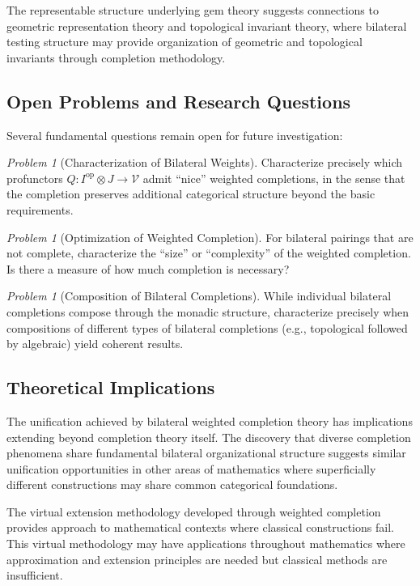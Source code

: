 \documentclass[11pt]{article}
\theoremstyle{plain}
\theoremstyle{definition}
\theoremstyle{remark}
\newtheorem{problem}[theorem]{Problem}
\newcommand{\V}{\mathcal{V}}
\newcommand{\op}{\mathrm{op}}
\begin{document}
The representable structure underlying gem theory suggests connections to geometric representation theory and topological invariant theory, where bilateral testing structure may provide organization of geometric and topological invariants through completion methodology.

\subsection{Open Problems and Research Questions}

Several fundamental questions remain open for future investigation:

\begin{problem}[Characterization of Bilateral Weights]
Characterize precisely which profunctors $Q : I^{\op} \otimes J \to \V$ admit ``nice'' weighted completions, in the sense that the completion preserves additional categorical structure beyond the basic requirements.
\end{problem}

\begin{problem}[Optimization of Weighted Completion]
For bilateral pairings that are not complete, characterize the ``size'' or ``complexity'' of the weighted completion. Is there a measure of how much completion is necessary?
\end{problem}

\begin{problem}[Composition of Bilateral Completions]
While individual bilateral completions compose through the monadic structure, characterize precisely when compositions of different types of bilateral completions (e.g., topological followed by algebraic) yield coherent results.
\end{problem}

\subsection{Theoretical Implications}

The unification achieved by bilateral weighted completion theory has implications extending beyond completion theory itself. The discovery that diverse completion phenomena share fundamental bilateral organizational structure suggests similar unification opportunities in other areas of mathematics where superficially different constructions may share common categorical foundations.

The virtual extension methodology developed through weighted completion provides approach to mathematical contexts where classical constructions fail. This virtual methodology may have applications throughout mathematics where approximation and extension principles are needed but classical methods are insufficient.
\end{document}
